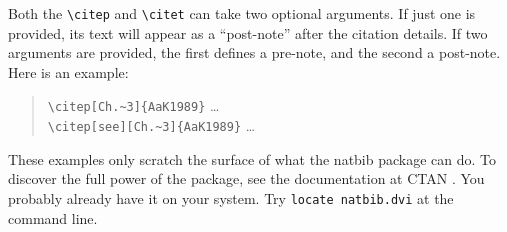 Both the \verb+\citep+ and \verb+\citet+ can take two optional arguments.
If just one is provided,  its text will appear as a ``post-note'' after the
citation details. If two arguments are provided, the first defines a
pre-note, and the second a post-note. Here is an example:
\begin{quote}
\verb+\citep[Ch.~3]{AaK1989}+ \ldots{} \citep[Ch.~3]{AaK1989}\\
\verb+\citep[see][Ch.~3]{AaK1989}+ \ldots{} \citep[see][Ch.~3]{AaK1989}\\
\end{quote}

These examples only scratch the surface of what the {\sf natbib} package
can do. To discover the full power of the package, see the documentation at
CTAN \citep{Dal1999}. You probably already have it on your system. Try
\verb+locate natbib.dvi+ at the command line.
